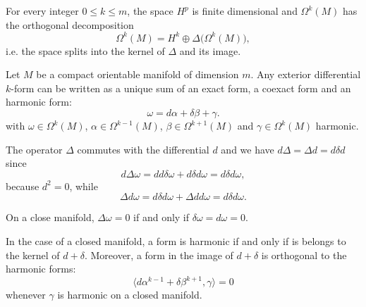 \begin{theorem}
	For every integer $0\leq k\leq m$, the space $H^p$ is finite dimensional and $\Omega^k(M)$ has the orthogonal decomposition
	\begin{equation}
		\Omega^k(M)=H^k\oplus\Delta\big( \Omega^k(M) \big),
	\end{equation}
	i.e. the space splits into the kernel of $\Delta$ and its image.
\end{theorem}

\begin{theorem}
	Let $M$ be a compact orientable manifold of dimension $m$. Any exterior differential $k$-form can be written as a unique sum of an exact form, a coexact form and an harmonic form:
	\begin{equation}
		\omega=d\alpha+\delta\beta+\gamma.
	\end{equation}
	with $\omega\in\Omega^k(M)$, $\alpha\in\Omega^{k-1}(M)$, $\beta\in\Omega^{k+1}(M)$ and $\gamma\in\Omega^k(M)$ harmonic.
\end{theorem}

The operator $\Delta$ commutes with the differential $d$ and we have $d\Delta=\Delta d= d\delta d$ since
\begin{equation}
	d\Delta \omega=dd\delta\omega+d\delta d\omega=d\delta d\omega,
\end{equation}
because $d^2=0$, while
\begin{equation}
	\Delta d\omega=d\delta d\omega+\Delta d d\omega=d\delta d\omega.
\end{equation}

\begin{lemma}
	On a close manifold, $\Delta\omega=0$ if and only if $\delta\omega=d\omega=0$.
\end{lemma}

In the case of a closed manifold, a form is harmonic if and only if is belongs to the kernel of $d+\delta$. Moreover, a form in the image of $d+\delta$ is orthogonal to the harmonic forms:
\begin{equation}
	\langle d\alpha^{k-1}+\delta\beta^{k+1}, \gamma\rangle =0
\end{equation}
whenever $\gamma$ is harmonic on a closed manifold.
